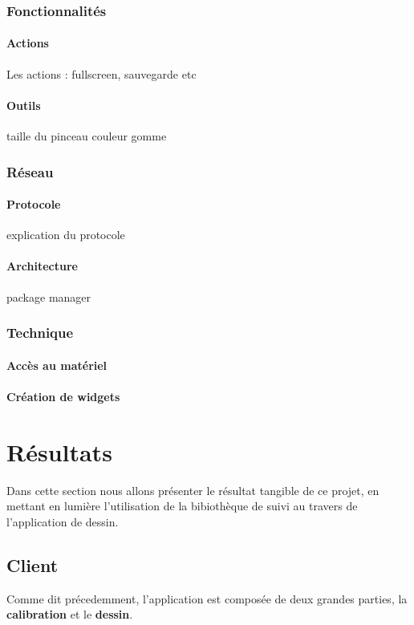 \documentclass{report}
\begin{document}
		\subsection{Fonctionnalités}
			\subsubsection{Actions}
				Les actions : fullscreen, sauvegarde etc
			\subsubsection{Outils}
				taille du pinceau couleur gomme
		\subsection{Réseau}
			\subsubsection{Protocole}
				explication du protocole
			\subsubsection{Architecture}
				package manager
		\subsection{Technique}
			\subsubsection{Accès au matériel}
			\subsubsection{Création de widgets}

	\chapter{Résultats}
		Dans cette section nous allons présenter le résultat tangible de ce projet, en mettant en lumière l'utilisation de la bibiothèque de suivi au travers de l'application de dessin.
		
		
			
		
		\section{Client}
			Comme dit précedemment, l'application est composée de deux grandes parties, la \textbf{calibration} et le \textbf{dessin}.
\end{document}
